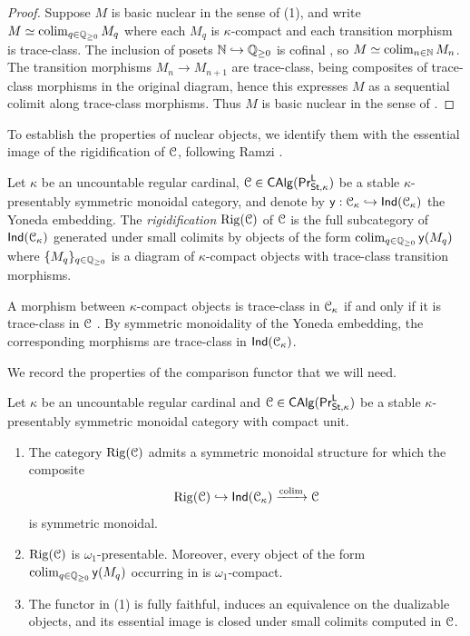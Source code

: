 \begin{proof}
    Suppose $M$ is basic nuclear in the sense of  (1), and write $M\simeq\operatorname*{colim}_{q\in\mathbb{Q}_{\geq0}}M_{q}$ where each $M_{q}$ is $\kappa$-compact and each transition morphism is trace-class. The inclusion of posets $\mathbb{N}\hookrightarrow\mathbb{Q}_{\geq0}$ is cofinal \cite[Rmk. 2.59]{RamziDualizable}, so $M\simeq\operatorname*{colim}_{n\in\mathbb{N}}M_{n}$. The transition morphisms $M_{n}\to M_{n+1}$ are trace-class, being composites of trace-class morphisms in the original diagram, hence this expresses $M$ as a sequential colimit along trace-class morphisms. Thus $M$ is basic nuclear in the sense of \cite[Def. 8.5]{Complex}.
\end{proof}
To establish the properties of nuclear objects, we identify them with the essential image of the rigidification of $\EuScript{C}$, following Ramzi \cite[Const. 4.79 \& Thm. 4.81]{RamziLocRigid}.
\begin{definition}\label{def: rigidification}
    Let $\kappa$ be an uncountable regular cardinal, $\EuScript{C}\in\mathsf{CAlg}(\mathsf{Pr}^{\mathsf{L}}_{\mathsf{St},\kappa})$ be a stable $\kappa$-presentably symmetric monoidal category, and denote by $\mathsf{y}:\EuScript{C}_{\kappa}\hookrightarrow\mathsf{Ind}(\EuScript{C}_{\kappa})$ the Yoneda embedding. The \emph{rigidification} $\mathrm{Rig}(\EuScript{C})$ of $\EuScript{C}$ is the full subcategory of $\mathsf{Ind}(\EuScript{C}_{\kappa})$ generated under small colimits by objects of the form $\operatorname*{colim}_{q\in\mathbb{Q}_{\geq0}}\mathsf{y}(M_{q})$ where $\{M_{q}\}_{q\in\mathbb{Q}_{\geq0}}$ is a diagram of $\kappa$-compact objects with trace-class transition morphisms. 
\end{definition}
\begin{remark}\label{rmk: computation of trace-class morphisms}
    A morphism between $\kappa$-compact objects is trace-class in $\EuScript{C}_{\kappa}$ if and only if it is trace-class in $\EuScript{C}$ \cite[Rmk. 3.2]{RamziLocRigid}. By symmetric monoidality of the Yoneda embedding, the corresponding morphisms are trace-class in $\mathsf{Ind}(\EuScript{C}_{\kappa})$.
\end{remark}
We record the properties of the comparison functor that we will need.
\begin{lemma}\label{lem: comparison functor from rigidification}
    Let $\kappa$ be an uncountable regular cardinal and $\EuScript{C}\in\mathsf{CAlg}(\mathsf{Pr}^{\mathsf{L}}_{\mathsf{St},\kappa})$ be a stable $\kappa$-presentably symmetric monoidal category with compact unit.
    \begin{enumerate}
        \item The category $\mathrm{Rig}(\EuScript{C})$ admits a symmetric monoidal structure for which the composite 
        $$\mathrm{Rig}(\EuScript{C})\hookrightarrow\mathsf{Ind}(\EuScript{C}_{\kappa})\xrightarrow{\operatorname*{colim}}\EuScript{C}$$
        is symmetric monoidal. 
        \item $\mathrm{Rig}(\EuScript{C})$ is $\omega_{1}$-presentable. Moreover, every object of the form $\operatorname*{colim}_{q\in\mathbb{Q}_{\geq0}}\mathsf{y}(M_{q})$ occurring in  is $\omega_{1}$-compact.
        \item The functor in (1) is fully faithful, induces an equivalence on the dualizable objects, and its essential image is closed under small colimits computed in $\EuScript{C}$. 
    \end{enumerate}
\end{lemma}
